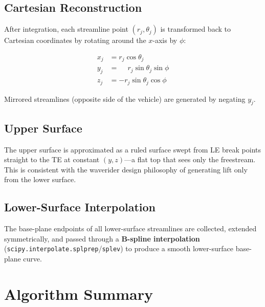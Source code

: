 \documentclass[12pt,a4paper]{article}
\begin{document}
\subsection{Cartesian Reconstruction}

After integration, each streamline point $(r_j, \theta_j)$ is transformed
back to Cartesian coordinates by rotating around the $x$-axis by $\phi$:

\begin{align}
    x_j &= r_j \cos\theta_j \\
    y_j &= \phantom{-}r_j \sin\theta_j \sin\phi \\
    z_j &= -r_j \sin\theta_j \cos\phi
    \label{eq:cart}
\end{align}

Mirrored streamlines (opposite side of the vehicle) are generated by negating
$y_j$.

\subsection{Upper Surface}

The upper surface is approximated as a ruled surface swept from LE break points
straight to the TE at constant $(y, z)$---a flat top that sees only the
freestream.  This is consistent with the waverider design philosophy of
generating lift only from the lower surface.

\subsection{Lower-Surface Interpolation}

The base-plane endpoints of all lower-surface streamlines are collected,
extended symmetrically, and passed through a \textbf{B-spline interpolation}
(\texttt{scipy.interpolate.splprep}/\texttt{splev}) to produce a smooth
lower-surface base-plane curve.

\section{Algorithm Summary}
\label{sec:algorithm}
\end{document}
